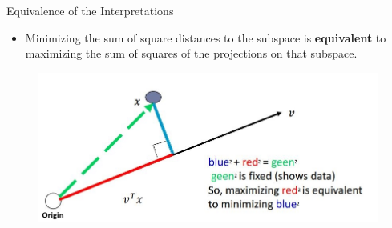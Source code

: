 \documentclass[serif, aspectratio=169]{beamer}
\begin{document}
\begin{frame}{Equivalence of the Interpretations}
    \begin{itemize}
        \item Minimizing the sum of square distances to the subspace is \textbf{equivalent} to maximizing the sum of squares of the projections on that subspace.
    \end{itemize}
    \begin{figure}[htpb]
        \begin{center}
            \includegraphics[keepaspectratio, scale=0.55]{pic/var_vs_rec2.JPG}
        \end{center}
    \end{figure}
\end{frame}


    
    
\end{document}
